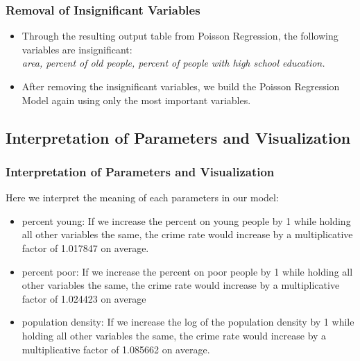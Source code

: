 \documentclass{beamer}
\begin{document}
\begin{frame}[fragile]
\frametitle{Removal of Insignificant Variables}

\begin{itemize}
\item Through the resulting output table from Poisson Regression, the following variables are insignificant:\\
\textsl{area, percent of old people, percent of people with high school education.}
\item After removing the insignificant variables, we build the Poisson Regression Model again using only the most important variables.
\end{itemize}
\end{frame}



\subsection{Interpretation of Parameters and Visualization}
\begin{frame}[fragile]
\frametitle{Interpretation of Parameters and Visualization}
Here we interpret the meaning of each parameters in our model:\\
\begin{itemize}
\item percent young:
If we increase the percent on young people by 1 while holding all other variables the same, the crime rate would increase by a multiplicative factor of 1.017847 on average.\\
\item percent poor: If we increase the percent on poor people by 1 while holding all other variables the same, the crime rate would increase by a multiplicative factor of 1.024423 on average\\
\item population density: If we increase the log of the population density by 1 while holding all other variables the same, the crime rate would increase by a multiplicative factor of 1.085662 on average.\\
\end{itemize}
\end{frame}
\end{document}
